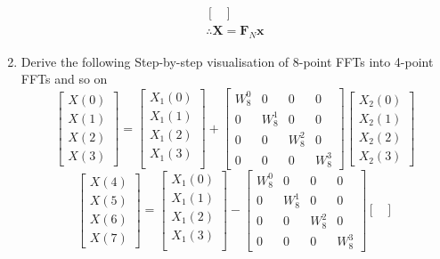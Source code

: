 \documentclass[journal,12pt,twocolumn]{IEEEtran}
\let\vec\mathbf
\numberwithin{equation}{section}
\renewcommand\thesection{\arabic{section}}
\begin{document}
\begin{enumerate}[label=\arabic*.,ref=\thesection.\theenumi]
\begin{align}
\begin{bmatrix}
\end{bmatrix}\\
\therefore \vec{X} = \vec{F}_N \vec{x}
\end{align}
\item Derive the following Step-by-step visualisation  of
8-point FFTs into 4-point FFTs and so on
\begin{equation}
\begin{bmatrix}
X(0) \\ 
X(1) \\ 
X(2) \\ 
X(3)
\end{bmatrix}
=
\begin{bmatrix}
X_{1}(0) \\ 
X_{1}(1)\\ 
X_{1}(2)\\
X_{1}(3)\\
\end{bmatrix}
+
\begin{bmatrix}
W^{0}_{8} & 0 & 0 & 0\\
0 & W^{1}_{8} & 0 & 0\\
0 & 0 & W^{2}_{8} & 0\\
0 & 0 & 0 & W^{3}_{8}
\end{bmatrix}
\begin{bmatrix}
X_{2}(0) \\ 
X_{2}(1) \\ 
X_{2}(2) \\
X_{2}(3)
\end{bmatrix}
\end{equation}
\begin{equation}
\begin{bmatrix}
X(4) \\ 
X(5) \\ 
X(6) \\ 
X(7)
\end{bmatrix}
=
\begin{bmatrix}
X_{1}(0) \\ 
X_{1}(1)\\ 
X_{1}(2)\\
X_{1}(3)\\
\end{bmatrix}
-
\begin{bmatrix}
W^{0}_{8} & 0 & 0 & 0\\
0 & W^{1}_{8} & 0 & 0\\
0 & 0 & W^{2}_{8} & 0\\
0 & 0 & 0 & W^{3}_{8}
\end{bmatrix}
\begin{bmatrix}

\end{bmatrix}
\end{equation}
\end{enumerate}
\end{document}
